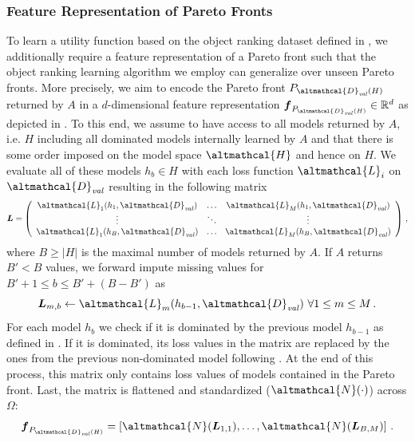 \subsubsection*{Feature Representation of Pareto Fronts}
To learn a utility function based on the object ranking dataset defined in , we additionally require a feature representation of a Pareto front such that the object ranking learning algorithm we employ can generalize over unseen Pareto fronts.
More precisely, we aim to encode the Pareto front $P_{\altmathcal{D}_\mathit{val}(H)}$ returned by $A$ in a $d$-dimensional feature representation $\vec{f}_{P_{\altmathcal{D}_\mathit{val}(H)}} \in \mathbb{R}^d$ as depicted in . To this end, we assume to have access to all models returned by $A$, i.e. $H$ including all dominated models internally learned by $A$ and that there is some order imposed on the model space $\altmathcal{H}$ and hence on $H$. We evaluate all of these models $h_b \in H$ with each loss function $\altmathcal{L}_i$ on $\altmathcal{D}_\mathit{val}$ resulting in the following matrix
\begin{equation}
    \vec{L} = \left( \begin{array}{ccc}
         \altmathcal{L}_1(h_1,\altmathcal{D}_{\mathit{val}}) & \ldots & \altmathcal{L}_M(h_1,\altmathcal{D}_{\mathit{val}}) \\
         \vdots & \ddots & \vdots \\
         \altmathcal{L}_1(h_B,\altmathcal{D}_{\mathit{val}}) & \ldots & \altmathcal{L}_M(h_B,\altmathcal{D}_{\mathit{val}}) \\
    \end{array} \right) \, ,
\end{equation}
where $B \geq \vert H \vert$ is the maximal number of models returned by $A$. If $A$ returns $B' < B$ values, we forward impute missing values for $B' + 1 \leq b \leq B' + (B - B')$ as 
\begin{equation}\label{moo-eq:replace_dominated}
    \vec{L}_{m,b} \leftarrow \altmathcal{L}_m(h_{b-1},\altmathcal{D}_{\mathit{val}}) ~ \forall 1 \leq m \leq M \, . 
\end{equation}
For each model $h_b$ we check if it is dominated by the previous model $h_{b-1}$ as defined in . If it is dominated, its loss values in the matrix are replaced by the ones from the previous non-dominated model following .
At the end of this process, this matrix only contains loss values of 
models contained in the Pareto front.
Last, the matrix is flattened and standardized ($\altmathcal{N}(\cdot)$) across $\Omega$: 
\begin{equation}\label{moo-eq:feature_representation}
    \vec{f}_{P_{\altmathcal{D}_\mathit{val}(H)}} = \left[ \altmathcal{N}(\vec{L}_{1,1}), 
    \ldots, \altmathcal{N}(\vec{L}_{B,M}) \right] \, .
\end{equation}

